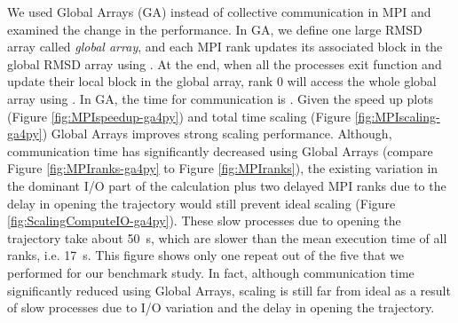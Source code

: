 We used Global Arrays (GA) \cite{GA, GAiN} instead of collective communication in MPI and examined the change in the performance. 
In GA, we define one large RMSD array called \emph{global array}, and each MPI rank updates its associated block in the global RMSD array using . 
At the end, when all the processes exit  function and update their local block in the global array, rank 0 will access the whole global array using .
In GA, the time for communication is .
Given the speed up plots (Figure \ref{fig:MPIspeedup-ga4py}) and total time scaling (Figure \ref{fig:MPIscaling-ga4py}) Global Arrays improves strong scaling performance.
Although, communication time has significantly decreased using Global Arrays (compare Figure \ref{fig:MPIranks-ga4py} to Figure \ref{fig:MPIranks}),
the existing variation in the dominant I/O part of the calculation plus two delayed MPI ranks due to the delay in opening the trajectory would still prevent ideal scaling (Figure \ref{fig:ScalingComputeIO-ga4py}).
These slow processes due to opening the trajectory take about 50~s, which are slower than the mean execution time of all ranks, i.e. 17~s. 
This figure shows only one repeat out of the five that we performed for our benchmark study. 
In fact, although communication time significantly reduced using Global Arrays, scaling is still far from ideal as a result of slow processes due to I/O variation and the delay in opening the trajectory.

